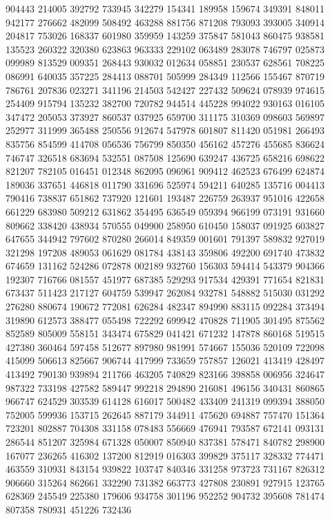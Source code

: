 {904443 214005 392792 733945 342279 154341 189958 159674 349391 848011 942177%
276662 482099 508492 463288 881756 871208 793093 393005 340914 204817 753026%
168337 601980 359959 143259 375847 581043 860475 938581 135523 260322 320380%
623863 963333 229102 063489 283078 746797 025873 099989 813529 009351 268443%
930032 012634 058851 230537 628561 708225 086991 640035 357225 284413 088701%
505999 284349 112566 155467 870719 786761 207836 023271 341196 214503 542427%
227432 509624 078939 974615 254409 915794 135232 382700 720782 944514 445228%
994022 930163 016105 347472 205053 373927 860537 037925 659700 311175 310369%
098603 569897 252977 311999 365488 250556 912674 547978 601807 811420 051981%
266493 835756 854599 414708 056536 756799 850350 456162 457276 455685 836624%
746747 326518 683694 532551 087508 125690 639247 436725 658216 698622 821207%
782105 016451 012348 862095 096961 909412 462523 676499 624874 189036 337651%
446818 011790 331696 525974 594211 640285 135716 004413 790416 738837 651862%
737920 121601 193487 226759 263937 951016 422658 661229 683980 509212 631862%
354495 636549 059394 966199 073191 931660 809662 338420 438934 570555 049900%
258950 610450 158037 091925 603827 647655 344942 797602 870280 266014 849359%
001601 791397 589832 927019 321298 197208 489053 061629 081784 438143 359806%
492200 691740 473832 674659 131162 524286 072878 002189 932760 156303 594414%
543379 904366 192307 716766 081557 451977 687385 529293 917534 429391 771654%
821831 673437 511423 217127 604759 539947 262084 932781 548882 515030 031292%
276280 880674 190672 772081 626284 482347 894990 883115 092284 373494 319890%
612573 388477 055498 722292 699942 470828 711905 301495 875562 852589 805009%
558151 343474 675829 041421 671232 147878 860168 519515 427380 360464 597458%
512677 897980 981991 574667 155036 520109 722098 415099 506613 825667 906744%
417999 733659 757857 126021 413419 428497 413492 790130 939894 211766 463205%
740829 823166 398858 006956 324647 987322 733198 427582 589447 992218 294890%
216081 496156 340431 860865 966747 624529 303539 614128 616017 500482 433409%
241319 099394 388050 752005 599936 153715 262645 887179 344911 475620 694887%
757470 151364 723201 802887 704308 331158 078483 556669 476941 793587 672141%
093131 286544 851207 325984 671328 050007 850940 837381 578471 840782 298900%
167077 236265 416302 137200 812919 016303 399829 375117 328332 774471 463559%
310931 843154 939822 103747 840346 331258 973723 731167 826312 906660 315264%
862661 332290 731382 663773 427808 230891 927915 123765 628369 245549 225380%
179606 934758 301196 952252 904732 395608 781474 807358 780931 451226 732436%
}
